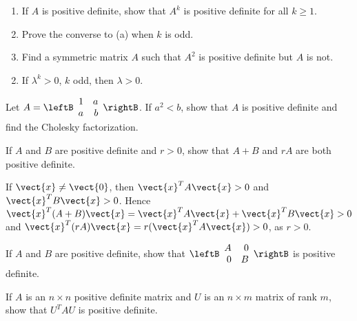 \begin{multicols}{2}
\begin{ex}
\begin{enumerate}[label={\alph*.}]
\item If $A$ is positive definite, show that $A^{k}$ is positive definite for all $k \geq 1$.

\item Prove the converse to (a) when $k$ is odd.

\item Find a symmetric matrix $A$ such that $A^{2}$ is positive definite but $A$ is not.

\end{enumerate}
\begin{sol}
\begin{enumerate}[label={\alph*.}]
\setcounter{enumi}{1}
\item  If $\lambda^{k} > 0$, $k$ odd, then $\lambda > 0$.

\end{enumerate}
\end{sol}
\end{ex}

\begin{ex}
Let $A = \leftB \begin{array}{rr}
1 & a \\
a & b
\end{array}\rightB$. If $a^{2} < b$, show that $A$ is positive definite and find the Cholesky factorization.
\end{ex}

\begin{ex}
If $A$ and $B$ are positive definite and $r > 0$, show that $A + B$ and $rA$ are both positive definite.

\begin{sol}
If $\vect{x} \neq \vect{0}$, then $\vect{x}^{T}A\vect{x} > 0$ and $\vect{x}^{T}B\vect{x} > 0$. Hence $\vect{x}^{T}(A + B)\vect{x} = \vect{x}^{T}A\vect{x} + \vect{x}^{T}B\vect{x} > 0$ and $\vect{x}^{T}(rA)\vect{x} = r(\vect{x}^{T}A\vect{x}) > 0$, as $r > 0$.
\end{sol}
\end{ex}

\begin{ex}
If $A$ and $B$ are positive definite, show that $\leftB \begin{array}{rr}
A & 0 \\
0 & B
\end{array}\rightB$ is positive definite.
\end{ex}

\begin{ex}
If $A$ is an $n \times n$ positive definite matrix and $U$ is an $n \times m$ matrix of rank $m$, show that $U^{T}AU$ is positive definite.


\end{ex}
\end{multicols}
